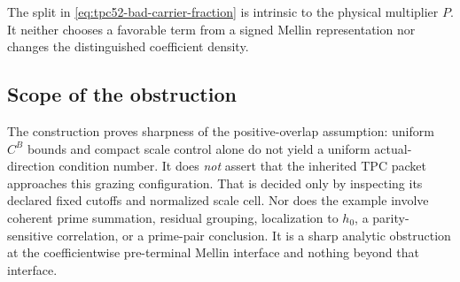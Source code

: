 The split in \eqref{eq:tpc52-bad-carrier-fraction} is intrinsic to the
physical multiplier \(P\).  It neither chooses a favorable term from a
signed Mellin representation nor changes the distinguished coefficient
density.

\subsection{Scope of the obstruction}

The construction proves sharpness of the positive-overlap assumption:
uniform \(C^B\) bounds and compact scale control alone do not yield a
uniform actual-direction condition number.  It does \emph{not} assert
that the inherited TPC packet approaches this grazing configuration.
That is decided only by inspecting its declared fixed cutoffs and
normalized scale cell.  Nor does the example involve coherent prime
summation, residual grouping, localization to \(h_0\), a
parity-sensitive correlation, or a prime-pair conclusion.  It is a
sharp analytic obstruction at the coefficientwise pre-terminal Mellin
interface and nothing beyond that interface.
